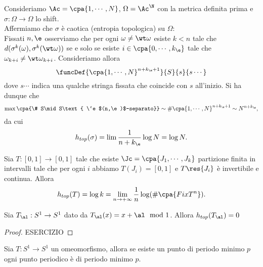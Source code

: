 \begin{example}
Consideriamo $\Ac=\cpa{1,\cdots, N}$, $\Omega=\Ac^\N$ con la metrica definita prima e $\sigma:\Omega\to\Omega$ lo shift.\\
Affermiamo che $\sigma$ \`e caotica (entropia topologica) su $\Omega$:\\
Fissati $n,\e$ osserviamo che per ogni $\omega\neq \wt\omega$ esiste $k<n$ tale che $d(\sigma^k(\omega),\sigma^k(\wt \omega))$ se e solo se esiste $i\in\cpa{0,\cdots, k_\e}$ tale che $\omega_{k+i}\neq \wt \omega_{k+i}$. Consideriamo allora
\[\funcDef{\cpa{1,\cdots, N}^{n+k_\e+1}}{S}{s}{s\cdots}\]
dove $s\cdots$ indica una qualche stringa fissata che coincide con $s$ all'inizio. Si ha dunque che
\[\max\cpa{\# S\mid S\text{ \`e $(n,\e)$-separato}}\sim \#\cpa{1,\cdots, N}^{n+k_\e+1}\sim N^{n+k_\e},\]
da cui
\[h_{top}(\sigma)=\lim \frac1{n+k_\e}\log N=\log N.\]
\end{example}

\begin{proposition}\label{EntropiaTopologicaEPartizioni}
Sia $T:[0,1]\to[0,1]$ tale che esiste $\Jc=\cpa{J_1,\cdots, J_k}$ partizione finita in intervalli tale che per ogni $i$ abbiamo $T(J_i)=[0,1]$ e $T\res{J_i}$ \`e invertibile e continua. Allora 
\[h_{top}(T)=\log k=\lim_{n\to+\infty}\frac1n\log(\#\cpa{Fix T^n}).\]
\end{proposition}

\begin{proposition}[]
Sia $T_\al:S^1\to S^1$ dato da $T_\al(x)=x+\al\mod 1$. Allora $h_{top}(T_\al)=0$
\end{proposition}
\begin{proof}
ESERCIZIO
\end{proof}


\begin{proposition}[]
Sia $T:S^1\to S^1$ un omeomorfismo, allora se esiste un punto di periodo minimo $p$ ogni punto periodico \`e di periodo minimo $p$.
\end{proposition}


